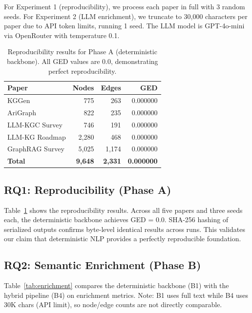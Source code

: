 \documentclass{article}
\begin{document}
For Experiment 1 (reproducibility), we process each paper in full with 3 random seeds. For Experiment 2 (LLM enrichment), we truncate to 30,000 characters per paper due to API token limits, running 1 seed. The LLM model is GPT-4o-mini via OpenRouter with temperature 0.1.

\begin{table}[t]
\centering
\caption{Reproducibility results for Phase A (deterministic backbone). All GED values are 0.0, demonstrating perfect reproducibility.}
\label{tab:reproducibility}
\begin{tabular}{lrrr}
\toprule
Paper & Nodes & Edges & GED \\
\midrule
KGGen & 775 & 263 & 0.000000 \\
AriGraph & 822 & 235 & 0.000000 \\
LLM-KGC Survey & 746 & 191 & 0.000000 \\
LLM-KG Roadmap & 2,280 & 468 & 0.000000 \\
GraphRAG Survey & 5,025 & 1,174 & 0.000000 \\
\midrule
\textbf{Total} & \textbf{9,648} & \textbf{2,331} & \textbf{0.000000} \\
\bottomrule
\end{tabular}
\end{table}

\subsection{RQ1: Reproducibility (Phase A)}

Table~\ref{tab:reproducibility} shows the reproducibility results. Across all five papers and three seeds each, the deterministic backbone achieves GED = 0.0. SHA-256 hashing of serialized outputs confirms byte-level identical results across runs. This validates our claim that deterministic NLP provides a perfectly reproducible foundation.

\subsection{RQ2: Semantic Enrichment (Phase B)}

Table~\ref{tab:enrichment} compares the deterministic backbone (B1) with the hybrid pipeline (B4) on enrichment metrics. Note: B1 uses full text while B4 uses 30K chars (API limit), so node/edge counts are not directly comparable.
\end{document}
